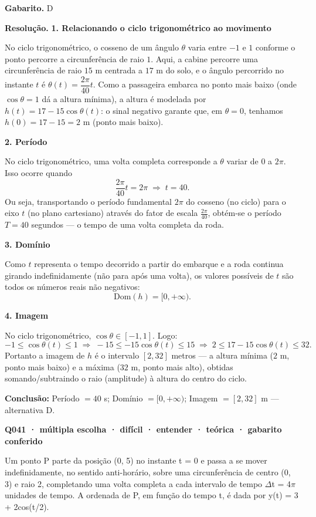 \documentclass[11pt,a4paper]{article}
\begin{document}
\textbf{Gabarito.} D

\textbf{Resolução.} \textbf{1. Relacionando o ciclo trigonométrico ao movimento}

No ciclo trigonométrico, o cosseno de um ângulo $\theta$ varia entre $-1$ e $1$ conforme o ponto percorre a circunferência de raio $1$. Aqui, a cabine percorre uma circunferência de raio $15$ m centrada a $17$ m do solo, e o ângulo percorrido no instante $t$ é $\theta(t) = \dfrac{2\pi}{40}t$. Como a passageira embarca no ponto mais baixo (onde $\cos\theta = 1$ dá a altura mínima), a altura é modelada por $h(t) = 17 - 15\cos\theta(t)$: o sinal negativo garante que, em $\theta=0$, tenhamos $h(0)=17-15=2$ m (ponto mais baixo).

\textbf{2. Período}

No ciclo trigonométrico, uma volta completa corresponde a $\theta$ variar de $0$ a $2\pi$. Isso ocorre quando
$$\frac{2\pi}{40}t = 2\pi \;\Rightarrow\; t = 40.$$
Ou seja, transportando o período fundamental $2\pi$ do cosseno (no ciclo) para o eixo $t$ (no plano cartesiano) através do fator de escala $\frac{2\pi}{40}$, obtém-se o período $T = 40$ segundos — o tempo de uma volta completa da roda.

\textbf{3. Domínio}

Como $t$ representa o tempo decorrido a partir do embarque e a roda continua girando indefinidamente (não para após uma volta), os valores possíveis de $t$ são todos os números reais não negativos:
$$\text{Dom}(h) = [0, +\infty).$$

\textbf{4. Imagem}

No ciclo trigonométrico, $\cos\theta \in [-1,1]$. Logo:
$$-1 \le \cos\theta(t) \le 1 \;\Rightarrow\; -15 \le -15\cos\theta(t) \le 15 \;\Rightarrow\; 2 \le 17-15\cos\theta(t) \le 32.$$
Portanto a imagem de $h$ é o intervalo $[2, 32]$ metros — a altura mínima ($2$ m, ponto mais baixo) e a máxima ($32$ m, ponto mais alto), obtidas somando/subtraindo o raio (amplitude) à altura do centro do ciclo.

\textbf{Conclusão:} Período $=40$ s; Domínio $=[0,+\infty)$; Imagem $=[2,32]$ m — alternativa D.

\bigskip\noindent\textbf{Q041 · múltipla escolha · difícil · entender · teórica · gabarito conferido}\par\nopagebreak
Um ponto P parte da posição (0, 5) no instante t = 0 e passa a se mover indefinidamente, no sentido anti-horário, sobre uma circunferência de centro (0, 3) e raio 2, completando uma volta completa a cada intervalo de tempo $\Delta$t = 4$\pi$ unidades de tempo. A ordenada de P, em função do tempo t, é dada por y(t) = 3 + 2cos(t/2).
\end{document}
